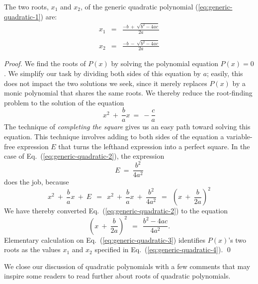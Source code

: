 \begin{prop}
\label{thm:quadratic-formula}
The two roots, $x_1$ and $x_2$, of the generic quadratic polynomial (\ref{eq:generic-quadratic-1}) are:
\begin{eqnarray}
\nonumber
x_1 & = & \frac{-b \ + \ \sqrt{b^2 -4ac}}{2a} \\
\label{eq:generic-quadratic-4}
    &   & \\
\nonumber
x_2 & = & \frac{-b \ - \ \sqrt{b^2 -4ac}}{2a}
\end{eqnarray}
\end{prop}


\begin{proof}
We find the roots of $P(x)$ by solving the polynomial equation $P(x) = 0$.  We simplify our task by dividing both sides of this equation by $a$; easily, this does not impact the two solutions we seek, since it merely replaces $P(x)$ by a monic polynomial that shares the same roots.  We thereby reduce the root-finding problem to the solution of the equation
\begin{equation}
\label{eq:generic-quadratic-2}
x^2 \ + \ \frac{b}{a} x \ = \ - \frac{c}{a}
\end{equation}
The technique of {\it completing the square} gives us an easy path toward solving this equation.  This technique involves adding to both sides of the equation a variable-free expression $E$ that turns the lefthand expression into a perfect square.  In the case of Eq.~(\ref{eq:generic-quadratic-2}), the expression
\[ E \ = \ \frac{b^2}{4a^2} \]
does the job, because
\[
x^2 \ + \ \frac{b}{a} x \ + \ E \ \ = \ \
x^2 \ + \ \frac{b}{a} x \ + \ \frac{b^2}{4a^2}
   \ \ = \ \ \left( x \ + \ \frac{b}{2a} \right)^2
\]
We have thereby converted Eq.~(\ref{eq:generic-quadratic-2}) to the equation
\begin{equation}
\label{eq:generic-quadratic-3}
\left( x \ + \ \frac{b}{2a} \right)^2
 \ \ = \ \ \frac{b^2 - 4ac}{4a^2}.
\end{equation}
Elementary calculation on Eq.~(\ref{eq:generic-quadratic-3}) identifies $P(x)$'s two roots as the values $x_1$ and $x_2$ specified in Eq.~(\ref{eq:generic-quadratic-4}).  \qed
\end{proof}

\bigskip

\noindent
We close our discussion of quadratic polynomials with a few comments that may inspire some readers to read further about roots of quadratic polynomials.

